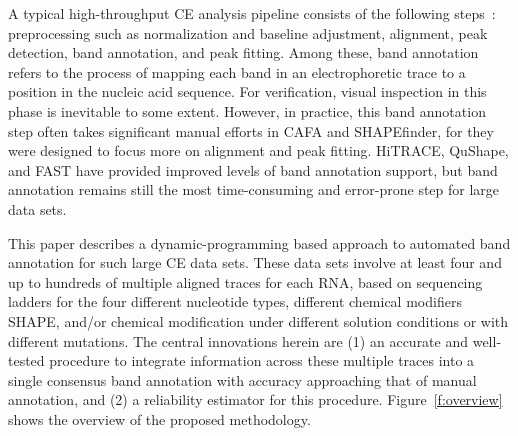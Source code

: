 A typical high-throughput CE analysis pipeline consists of the following steps~\citep{Yoon2011,Karabiber2013,Kladwang2014}: preprocessing such as normalization and baseline adjustment, alignment, peak detection, band annotation, and peak fitting. Among these, band annotation refers to the process of mapping each band in an electrophoretic trace to a position in the nucleic acid sequence. For verification, visual inspection in this phase is inevitable to some extent. However, in practice, this band annotation step often takes significant manual efforts in CAFA and SHAPEfinder, for they were designed to focus more on alignment and peak fitting. HiTRACE, QuShape, and FAST have provided improved levels of band annotation support, but band annotation remains still the most time-consuming and error-prone step for large data sets.

This paper describes a dynamic-programming based approach to automated band annotation for such large CE data sets. These data sets involve at least four and up to hundreds of multiple aligned traces for each RNA, based on sequencing ladders for the four different nucleotide types, different chemical modifiers SHAPE, and/or chemical modification under different solution conditions or with different mutations. The central innovations herein are (1) an accurate and well-tested procedure to integrate information across these multiple traces into a single consensus band annotation with accuracy approaching that of manual annotation, and (2) a reliability estimator for this procedure. Figure~\ref{f:overview} shows the overview of the proposed methodology.



